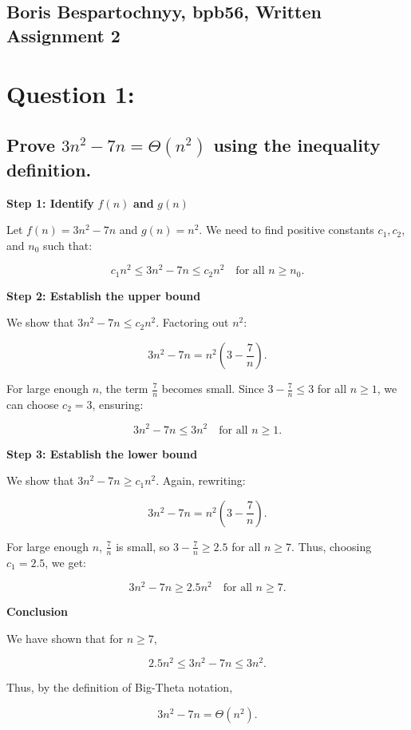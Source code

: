 \documentclass{article}
\begin{document}
\subsection*{Boris Bespartochnyy, bpb56, Written Assignment 2}
\section*{Question 1:}
\subsection*{Prove \( 3n^2 - 7n = \Theta(n^2)\) using the inequality definition.}

\textbf{Step 1: Identify } \( f(n) \) \textbf{ and } \( g(n) \)

Let \( f(n) = 3n^2 - 7n \) and \( g(n) = n^2 \). We need to find positive constants \( c_1, c_2 \), and \( n_0 \) such that:

\[c_1 n^2 \leq 3n^2 - 7n \leq c_2 n^2 \quad \text{for all } n \geq n_0.\]

\textbf{Step 2: Establish the upper bound}

We show that \( 3n^2 - 7n \leq c_2 n^2 \). Factoring out \( n^2 \):

\[3n^2 - 7n = n^2 \left( 3 - \frac{7}{n} \right).\]

For large enough \( n \), the term \( \frac{7}{n} \) becomes small. Since \( 3 - \frac{7}{n} \leq 3 \) for all \( n \geq 1 \), we can choose \( c_2 = 3 \), ensuring:

\[3n^2 - 7n \leq 3n^2 \quad \text{for all } n \geq 1.\]

\textbf{Step 3: Establish the lower bound}

We show that \( 3n^2 - 7n \geq c_1 n^2 \). Again, rewriting:

\[3n^2 - 7n = n^2 \left( 3 - \frac{7}{n} \right).\]

For large enough \( n \), \( \frac{7}{n} \) is small, so \( 3 - \frac{7}{n} \geq 2.5 \) for all \( n \geq 7 \). Thus, choosing \( c_1 = 2.5 \), we get:

\[3n^2 - 7n \geq 2.5n^2 \quad \text{for all } n \geq 7.\]

\textbf{Conclusion}

We have shown that for \( n \geq 7 \),

\[2.5n^2 \leq 3n^2 - 7n \leq 3n^2.\]

Thus, by the definition of Big-Theta notation,

\[3n^2 - 7n = \Theta(n^2).\]
\end{document}
